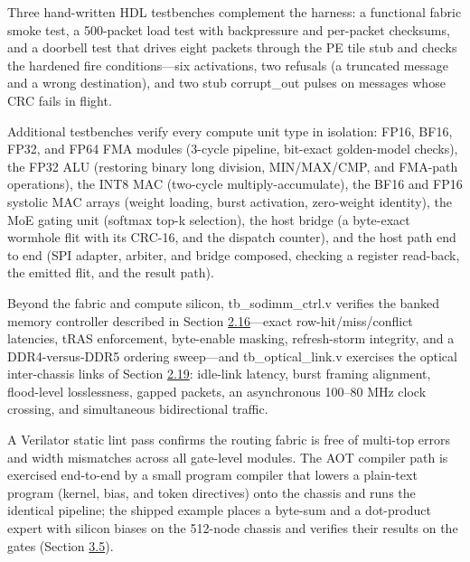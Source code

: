 \documentclass[10pt,twocolumn]{article}
\begin{document}
Three hand-written HDL testbenches complement the harness: a functional fabric smoke test, a 500-packet load test with backpressure and per-packet checksums, and a doorbell test that drives eight packets through the PE tile stub and checks the hardened fire conditions---six activations, two refusals (a truncated message and a wrong destination), and two stub corrupt\_out pulses on messages whose CRC fails in flight.

Additional testbenches verify every compute unit type in isolation: FP16, BF16, FP32, and FP64 FMA modules (3-cycle pipeline, bit-exact golden-model checks), the FP32 ALU (restoring binary long division, MIN/MAX/CMP, and FMA-path operations), the INT8 MAC (two-cycle multiply-accumulate), the BF16 and FP16 systolic MAC arrays (weight loading, burst activation, zero-weight identity), the MoE gating unit (softmax top-k selection), the host bridge (a byte-exact wormhole flit with its CRC-16, and the dispatch counter), and the host path end to end (SPI adapter, arbiter, and bridge composed, checking a register read-back, the emitted flit, and the result path).

Beyond the fabric and compute silicon, tb\_sodimm\_ctrl.v verifies the banked memory controller described in Section \hyperref[sec:2.16]{2.16}---exact row-hit/miss/conflict latencies, tRAS enforcement, byte-enable masking, refresh-storm integrity, and a DDR4-versus-DDR5 ordering sweep---and tb\_optical\_link.v exercises the optical inter-chassis links of Section \hyperref[sec:2.19]{2.19}: idle-link latency, burst framing alignment, flood-level losslessness, gapped packets, an asynchronous 100--80 MHz clock crossing, and simultaneous bidirectional traffic.

A Verilator static lint pass confirms the routing fabric is free of multi-top errors and width mismatches across all gate-level modules. The AOT compiler path is exercised end-to-end by a small program compiler that lowers a plain-text program (kernel, bias, and token directives) onto the chassis and runs the identical pipeline; the shipped example places a byte-sum and a dot-product expert with silicon biases on the 512-node chassis and verifies their results on the gates (Section \hyperref[sec:3.5]{3.5}).
\end{document}
